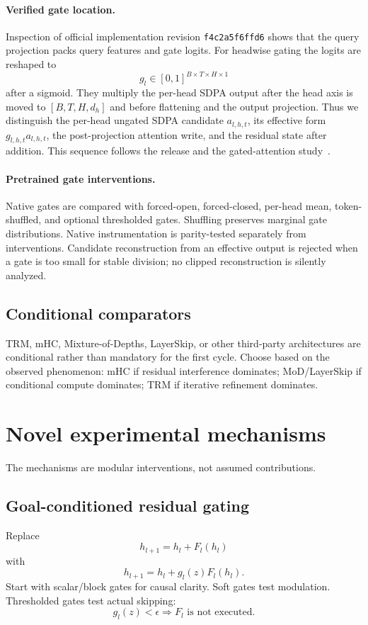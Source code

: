 \documentclass[10pt]{article}
\begin{document}
\paragraph{Verified gate location.}
Inspection of official implementation revision \texttt{f4c2a5f6ffd6} shows that the query projection packs query features and gate logits. For headwise gating the logits are reshaped to
\[
g_{l}\in[0,1]^{B\times T\times H\times 1}
\]
after a sigmoid. They multiply the per-head SDPA output after the head axis is moved to $[B,T,H,d_h]$ and before flattening and the output projection. Thus we distinguish the per-head ungated SDPA candidate $a_{l,h,t}$, its effective form $g_{l,h,t}a_{l,h,t}$, the post-projection attention write, and the residual state after addition. This sequence follows the release and the gated-attention study~\cite{qiu2025gatedattention}.

\paragraph{Pretrained gate interventions.}
Native gates are compared with forced-open, forced-closed, per-head mean, token-shuffled, and optional thresholded gates. Shuffling preserves marginal gate distributions. Native instrumentation is parity-tested separately from interventions. Candidate reconstruction from an effective output is rejected when a gate is too small for stable division; no clipped reconstruction is silently analyzed.

\subsection{Conditional comparators}
TRM, mHC, Mixture-of-Depths, LayerSkip, or other third-party architectures are conditional rather than mandatory for the first cycle. Choose based on the observed phenomenon: mHC if residual interference dominates; MoD/LayerSkip if conditional compute dominates; TRM if iterative refinement dominates.

\section{Novel experimental mechanisms}
The mechanisms are modular interventions, not assumed contributions.

\subsection{Goal-conditioned residual gating}
Replace
\[
h_{l+1}=h_l+F_l(h_l)
\]
with
\[
h_{l+1}=h_l+g_l(z)F_l(h_l).
\]
Start with scalar/block gates for causal clarity. Soft gates test modulation. Thresholded gates test actual skipping:
\[
g_l(z)<\epsilon \Rightarrow F_l\text{ is not executed}.
\]
\end{document}
